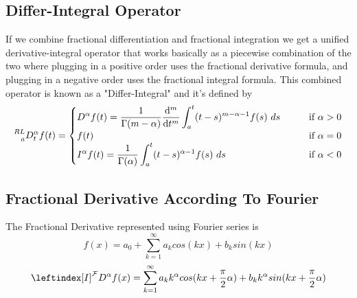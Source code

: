 \subsection{Differ-Integral Operator}
If we combine fractional differentiation and fractional 
integration we get a unified derivative-integral operator 
that works basically as a piecewise combination of the two where 
plugging in a positive order uses the fractional derivative 
formula, and plugging in a negative order uses the fractional 
integral formula. This combined operator is known as a 
"Differ-Integral" and it's defined by
\[
    \prescript{RL}{a}{D_{t}^{\alpha}} f(t) = 
    \begin{cases}
        \displaystyle D^{\alpha} f(t) = \frac{1}{\Gamma(m-\alpha)} \dv[m]{}{t}\int_{a}^{t} (t-s)^{m - \alpha -1}f(s) \,\, ds \qquad &\text{if } \alpha > 0
        \\
        \displaystyle f(t)  &\text{if } \alpha = 0
        \\
        \displaystyle I^{\alpha} f(t) = \frac{1}{\Gamma(\alpha)}\int_{a}^{t} (t-s)^{\alpha -1}f(s) \,\, ds &\text{if } \alpha < 0
    \end{cases}
\]
\subsection{Fractional Derivative According To Fourier}
The Fractional Derivative represented using Fourier series is 
\[
    f(x) = a_0 + \sum_{k=1}^{\infty} a_k cos(kx) + b_k sin(kx)
\]
\[
    \leftindex[I]^{\mathcal{F}} {D^{\alpha}} f(x) = \sum_{k=1}^{\infty} a_k k^\alpha cos(kx + \frac{\pi}{2} \alpha) + b_k k^\alpha sin(kx + \frac{\pi}{2} \alpha)
\]
\newpage
